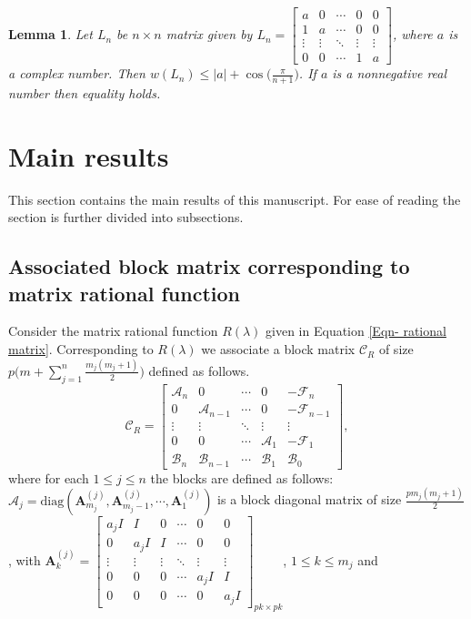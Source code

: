 \documentclass[12pt, reqno]{amsart}
\newtheorem{lemma}[theorem]{Lemma}
\theoremstyle{definition}
\theoremstyle{remark}
\numberwithin{equation}{section}
\begin{document}
\begin{lemma}\label{Lem-numerical radius-Jordan block}
Let $L_n$ be $n \times n$ matrix given by $L_n =\begin{bmatrix}
a & 0 & \cdots & 0 & 0\\
1 & a & \cdots & 0 & 0\\
\vdots & \vdots & \ddots & \vdots & \vdots \\
0 & 0 & \cdots & 1 & a 
\end{bmatrix}$, where $a$ is a complex number. Then $w(L_n) \leq \displaystyle |a|+ 
\cos\Big(\frac{\pi}{n+1}\Big)$. 
If $a$ is a nonnegative real number then equality holds.
\end{lemma}

\medskip
\section{Main results}\label{sec-3}
This section contains the main results of this manuscript. For ease of reading the 
section is further divided into subsections.

\medskip
\subsection{Associated block matrix corresponding to matrix rational function}\label{sec-3.1}

Consider the matrix rational function $R(\lambda)$ given in Equation 
\eqref{Eqn- rational matrix}. Corresponding to $R(\lambda)$ we associate a block 
matrix $\mathcal{C}_R$ of size $p\Big(m + \displaystyle \sum_{j=1}^{n}\frac{m_j(m_j+1)}{2}\Big)$ 
defined as follows.
\begin{equation}
\mathcal{C}_R= \begin{bmatrix}
\mathcal{A}_n & 0 & \cdots & 0 & -\mathcal{F}_n \\
0 & \mathcal{A}_{n-1} & \cdots & 0 & -\mathcal{F}_{n-1} \\
\vdots & \vdots & \ddots & \vdots & \vdots \\
0 & 0 & \cdots & \mathcal{A}_1 & -\mathcal{F}_1 \\
\mathcal{B}_n & \mathcal{B}_{n-1} & \cdots & \mathcal{B}_1 & \mathcal{B}_0
\end{bmatrix},
\end{equation}
where for each $1 \leq j \leq n$ the blocks are defined as follows: \\
$\mathcal{A}_j = \text{diag}(\textbf{A}_{m_j}^{(j)},\textbf{A}_{m_j-1}^{(j)},
\cdots,\textbf{A}_1^{(j)})$ is a block diagonal matrix of size $ \displaystyle 
\frac{pm_j(m_j+1)}{2}$, with $\textbf{A}_k^{(j)} 
=\begin{bmatrix}
a_jI & I & 0 & \cdots & 0 & 0 \\
0 & a_jI & I & \cdots & 0 & 0 \\
\vdots & \vdots & \vdots & \ddots & \vdots & \vdots \\
0 & 0 & 0 & \cdots & a_jI & I \\
0 & 0 & 0 & \cdots & 0 & a_jI
\end{bmatrix}_{pk \times pk}$, $1\leq k \leq m_j$ and 
\end{document}
